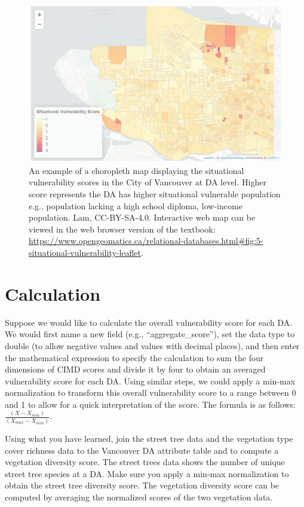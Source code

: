 \documentclass[
]{book}
\begin{document}
\begin{figure}
\includegraphics[width=1\linewidth]{images/05-situational-vulnerability-leaflet} \caption{An example of a choropleth map displaying the situational vulnerability scores in the City of Vancouver at DA level. Higher score represents the DA has higher situational vulnerable population e.g., population lacking a high school diploma, low-income population. Lam, CC-BY-SA-4.0. Interactive web map can be viewed in the web browser version of the textbook: \url{https://www.opengeomatics.ca/relational-databases.html\#fig:5-situational-vulnerability-leaflet}.}\label{fig:5-situational-vulnerability-leaflet}
\end{figure}

\section{Calculation}\label{calculation}

Suppose we would like to calculate the overall vulnerability score for each DA. We would first name a new field (e.g., ``aggregate\_score''), set the data type to double (to allow negative values and values with decimal places), and then enter the mathematical expression to specify the calculation to sum the four dimensions of CIMD scores and divide it by four to obtain an averaged vulnerability score for each DA. Using similar steps, we could apply a min-max normalization to transform this overall vulnerability score to a range between 0 and 1 to allow for a quick interpretation of the score. The formula is as follows: \(\frac{(X - X_{min})}{(X_{max} - X_{min})}\).

Using what you have learned, join the street tree data and the vegetation type cover richness data to the Vancouver DA attribute table and to compute a vegetation diversity score. The street trees data shows the number of unique street tree species at a DA. Make sure you apply a min-max normalization to obtain the street tree diversity score. The vegetation diversity score can be computed by averaging the normalized scores of the two vegetation data.
\end{document}
